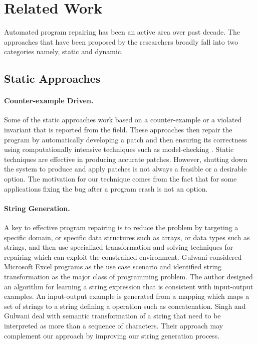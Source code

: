 \section{Related Work}
\label{sec:relatedWork}

Automated program repairing has been an active
area over past decade. The approaches that have been proposed by the researchers
broadly fall into two categories namely, static and dynamic.

\subsection{Static Approaches}
\paragraph{Counter-example Driven.}
Some of the static approaches work based on a counter-example or a violated
invariant that is reported from the field. These approaches then repair the
program by automatically developing a patch and then ensuring its correctness
using computationally intensive techniques such as model-checking
\cite{biere2014, wei-issta-2010}. Static techniques are effective in producing accurate patches.
However, shutting down the system to produce and apply patches is not always a feasible or
a desirable option. The motivation for our technique comes from the fact that for some
applications fixing the bug after a program crash is not an option.

\paragraph{String Generation.}
A key to effective program repairing is to reduce the problem by 
targeting a specific domain, or specific data structures such as arrays, or data types such as strings, and then use
specialized transformation and solving techniques for repairing which can exploit the constrained environment.
Gulwani \cite{Gulwani:2011} considered Microsoft Excel programs as the use case scenario and
identified string transformation as the major class of programming problem.
The author designed an algorithm for learning a string expression
that is consistent with input-output examples. An input-output example is
generated from a mapping which maps a set of strings to a string defining a
operation such as concatenation.
Singh and Gulwani \cite{Singh:2012} deal with semantic transformation of a string that need 
to be interpreted as more than a sequence of
characters. Their approach may complement our approach by
improving our string generation process.

